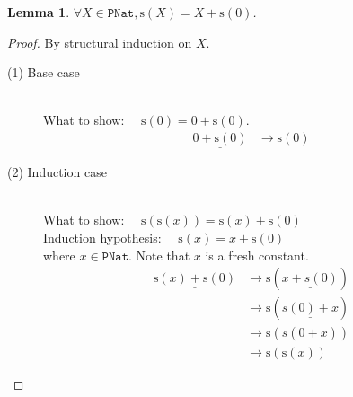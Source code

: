 \documentclass[12pt, a4paper]{article}
\newtheorem{lemma}[theorem]{Lemma}
\newcommand{\rel}[1]{\mathrel{#1}}
\newcommand{\rmx}[1]{\mathrm{#1}}
\newcommand{\larrow}{\longrightarrow}
\newcommand{\under}{\underline}
\begin{document}
\begin{lemma}
\label{lm2}
$\forall X \in \mathtt{PNat}, \rmx{s}(X) = X \rel{+} \rmx{s}(0)$.
\end{lemma}
\begin{proof}
By structural induction on $X$.

\begin{description}

\item[(1) Base case]~\\
\noindent
What to show: $\quad \rmx{s}(0) = 0 \rel{+} \rmx{s}(0)$.
\begin{align*}
\under{0 \rel{+} \rmx{s}(0)}
	&\larrow \rmx{s}(0) \tag{by +1}
\end{align*}

\item[(2) Induction case]~\\
What to show: $\quad \rmx{s}(\rmx{s}(x)) = \rmx{s}(x) \rel{+} \rmx{s}(0)$ \\
Induction hypothesis: $\quad \rmx{s}(x) = x \rel{+} \rmx{s}(0)$  \\
where $x \in \mathtt{PNat}$. Note that $x$ is a fresh constant.
\begin{align*}
\under{\rmx{s}(x) \rel{+} \rmx{s}(0)}
	&\larrow \rmx{s}(\under{x + s(0)}) \tag{by +2} \\
	&\larrow \rmx{s}(\under{s(0) + x}) \tag{by comm+} \\
	&\larrow \rmx{s}(s(\under{0 + x})) \tag{by +2} \\
	&\larrow \rmx{s}(\rmx{s}(x)) \tag{by +1}
\end{align*}

\end{description}
\end{proof}
\end{document}
